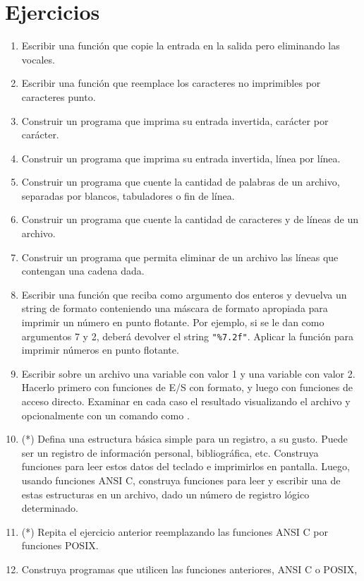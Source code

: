 
\section{Ejercicios}
\label{sec:tc-esstandard-ej}
\begin{enumerate}
\item Escribir una función que copie la entrada en la salida pero eliminando las
vocales.
\item Escribir una función que reemplace los caracteres no imprimibles por
caracteres punto.
\item Construir un programa que imprima su entrada invertida, carácter por carácter.
\item Construir un programa que imprima su entrada invertida, línea por línea.
\item Construir un programa que cuente la cantidad de palabras de un archivo,
separadas por blancos, tabuladores o fin de línea.
\item Construir un programa que cuente la cantidad de caracteres y de líneas de un
archivo.
\item Construir un programa que permita eliminar de un archivo las líneas que
contengan una cadena dada.
\item Escribir una función que reciba como argumento dos enteros y devuelva un
string de formato conteniendo una máscara de formato apropiada para imprimir un
número en punto flotante. Por ejemplo, si se le dan como argumentos 7 y 2,
deberá devolver el string \lstinline{"%7.2f"}. Aplicar la función para imprimir números en
punto flotante.
\item Escribir sobre un archivo una variable  con valor 1 y una variable 
con valor 2. Hacerlo primero con funciones de E/S con formato, y luego con
funciones de acceso directo. Examinar en cada caso el resultado visualizando el
archivo y opcionalmente con un comando como .
\item (*) Defina una estructura básica simple para un registro, a su gusto. Puede ser
un registro de información personal, bibliográfica, etc. Construya funciones
para leer estos datos del teclado e imprimirlos en pantalla. Luego, usando
funciones ANSI C, construya funciones para leer y escribir una de estas
estructuras en un archivo, dado un número de registro lógico determinado.
\item (*) Repita el ejercicio anterior reemplazando las funciones ANSI C por funciones
POSIX.
\item Construya programas que utilicen las funciones anteriores, ANSI C o POSIX,

\end{enumerate}

